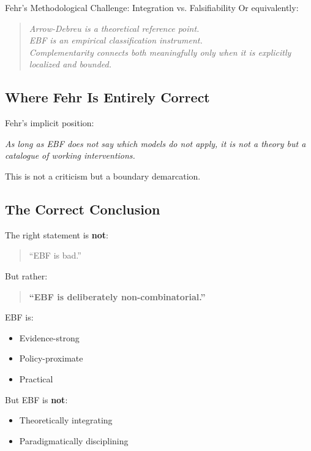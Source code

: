 \begin{chapter}{Fehr's Methodological Challenge: Integration vs. Falsifiability}
Or equivalently:

\begin{quote}
\textit{Arrow-Debreu is a theoretical reference point.\\
EBF is an empirical classification instrument.\\
Complementarity connects both meaningfully only when it is explicitly localized and bounded.}
\end{quote}

\subsection{Where Fehr Is Entirely Correct}

Fehr's implicit position:

\begin{tcolorbox}[colback=gray!10!white,colframe=gray!75!black]
\textit{As long as EBF does not say which models do not apply, it is not a theory but a catalogue of working interventions.}
\end{tcolorbox}

This is not a criticism but a boundary demarcation.

\subsection{The Correct Conclusion}

The right statement is \textbf{not}:

\begin{quote}
``EBF is bad.''
\end{quote}

But rather:

\begin{quote}
\textbf{``EBF is deliberately non-combinatorial.''}
\end{quote}

EBF is:
\begin{itemize}[noitemsep]
    \item Evidence-strong
    \item Policy-proximate
    \item Practical
\end{itemize}

But EBF is \textbf{not}:
\begin{itemize}[noitemsep]
    \item Theoretically integrating
    \item Paradigmatically disciplining
\end{itemize}


\end{chapter}
